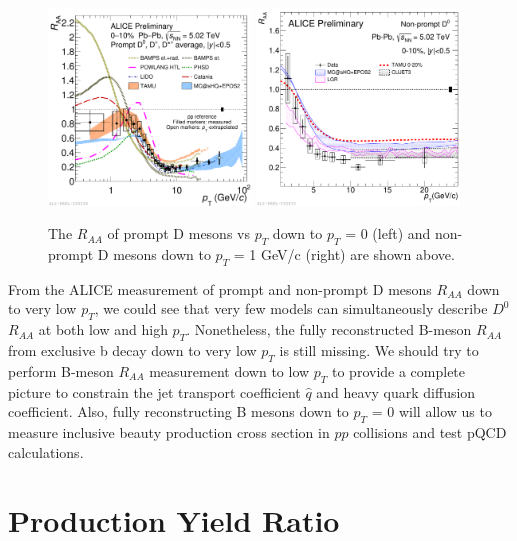 \begin{figure}[hbtp]
\begin{center}
\includegraphics[width=0.48\textwidth]{Figures/Chapter2/ALICEDRAALow.pdf}
\includegraphics[width=0.48\textwidth]{Figures/Chapter2/ALICENPDRAALow.pdf}
\caption{The $R_{AA}$ of prompt D mesons vs $p_T$ down to $p_T$ = 0 (left) and non-prompt D mesons down to $p_T$ = 1 GeV/c (right) are shown above.}
\label{ALICEDRAALow}
\end{center}
\end{figure}   

From the ALICE measurement of prompt and non-prompt D mesons $R_{AA}$ down to very low $p_T$, we could see that very few models can simultaneously describe $D^0$ $R_{AA}$ at both low and high $p_T$. Nonetheless, the fully reconstructed B-meson $R_{AA}$ from exclusive b decay down to very low $p_T$ is still missing. We should try to perform B-meson $R_{AA}$ measurement down to low $p_T$ to provide a complete picture to constrain the jet transport coefficient $\hat q$ and heavy quark diffusion coefficient. Also, fully reconstructing B mesons down to $p_T$ = 0 will allow us to measure inclusive beauty production cross section in $pp$ collisions and test pQCD calculations.  


\section{Production Yield Ratio}

